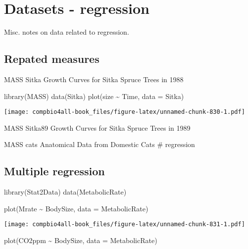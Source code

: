 \documentclass[
]{book}
\newenvironment{Shaded}{\begin{snugshade}}{\end{snugshade}}
\newcommand{\AttributeTok}[1]{\textcolor[rgb]{0.77,0.63,0.00}{#1}}
\newcommand{\FunctionTok}[1]{\textcolor[rgb]{0.00,0.00,0.00}{#1}}
\newcommand{\NormalTok}[1]{#1}
\newcommand{\SpecialCharTok}[1]{\textcolor[rgb]{0.00,0.00,0.00}{#1}}
\begin{document}
\hypertarget{datasets---regression}{%
\chapter{Datasets - regression}\label{datasets---regression}}

Misc. notes on data related to regression.

\hypertarget{repated-measures}{%
\section{Repated measures}\label{repated-measures}}

MASS Sitka Growth Curves for Sitka Spruce Trees in 1988

\begin{Shaded}
\begin{Highlighting}[]
\FunctionTok{library}\NormalTok{(MASS)}
\FunctionTok{data}\NormalTok{(Sitka)}
\FunctionTok{plot}\NormalTok{(size }\SpecialCharTok{\textasciitilde{}}\NormalTok{ Time, }\AttributeTok{data =}\NormalTok{ Sitka)}
\end{Highlighting}
\end{Shaded}

\texttt{[image: compbio4all-book\_files/figure-latex/unnamed-chunk-830-1.pdf]}

MASS Sitka89 Growth Curves for Sitka Spruce Trees in 1989

MASS cats Anatomical Data from Domestic Cats \# regression

\hypertarget{multiple-regression}{%
\section{Multiple regression}\label{multiple-regression}}

\begin{Shaded}
\begin{Highlighting}[]
\FunctionTok{library}\NormalTok{(Stat2Data)}
\FunctionTok{data}\NormalTok{(MetabolicRate)}

\FunctionTok{plot}\NormalTok{(Mrate }\SpecialCharTok{\textasciitilde{}}\NormalTok{ BodySize, }\AttributeTok{data =}\NormalTok{ MetabolicRate)}
\end{Highlighting}
\end{Shaded}

\texttt{[image: compbio4all-book\_files/figure-latex/unnamed-chunk-831-1.pdf]}

\begin{Shaded}
\begin{Highlighting}[]
\FunctionTok{plot}\NormalTok{(CO2ppm }\SpecialCharTok{\textasciitilde{}}\NormalTok{ BodySize, }\AttributeTok{data =}\NormalTok{ MetabolicRate)}
\end{Highlighting}
\end{Shaded}
\end{document}
